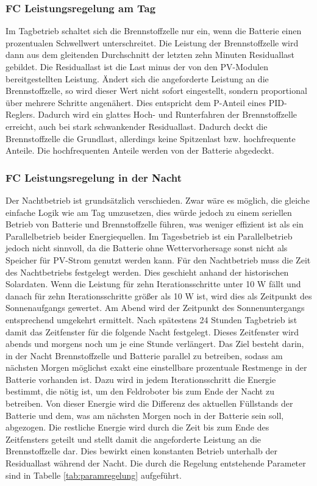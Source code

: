 \subsubsection{FC Leistungsregelung am Tag}
Im Tagbetrieb schaltet sich die Brennstoffzelle nur ein, wenn die Batterie einen prozentualen Schwellwert unterschreitet. Die Leistung der Brennstoffzelle wird dann aus dem gleitenden Durchschnitt der letzten zehn Minuten Residuallast gebildet. Die Residuallast ist die Last minus der von den PV-Modulen bereitgestellten Leistung. Ändert sich die angeforderte Leistung an die Brennstoffzelle, so wird dieser Wert nicht sofort eingestellt, sondern proportional über mehrere Schritte angenähert. Dies entspricht dem P-Anteil eines PID-Reglers. Dadurch wird ein glattes Hoch- und Runterfahren der Brennstoffzelle erreicht, auch bei stark schwankender Residuallast. Dadurch deckt die Brennstoffzelle die Grundlast, allerdings keine Spitzenlast bzw. hochfrequente Anteile. Die hochfrequenten Anteile werden von der Batterie abgedeckt. \\

\subsubsection{FC Leistungsregelung in der Nacht}
Der Nachtbetrieb ist grundsätzlich verschieden. Zwar wäre es möglich, die gleiche einfache Logik wie am Tag umzusetzen, dies würde jedoch zu einem seriellen Betrieb von Batterie und Brennstoffzelle führen, was weniger effizient ist als ein Parallelbetrieb beider Energiequellen. 
Im Tagesbetrieb ist ein Parallelbetrieb jedoch nicht sinnvoll, da die Batterie ohne Wettervorhersage sonst nicht als Speicher für PV-Strom genutzt werden kann. Für den Nachtbetrieb muss die Zeit des Nachtbetriebs festgelegt werden. Dies geschieht anhand der historischen Solardaten. Wenn die Leistung für zehn Iterationsschritte unter 10 W fällt und danach für zehn Iterationsschritte größer als 10 W ist, wird dies als Zeitpunkt des Sonnenaufgangs gewertet. Am Abend wird der Zeitpunkt des Sonnenuntergangs entsprechend umgekehrt ermittelt. Nach spätestens 24 Stunden Tagbetrieb ist damit das Zeitfenster für die folgende Nacht festgelegt. Dieses Zeitfenster wird abends und morgens noch um je eine Stunde verlängert. Das Ziel besteht darin, in der Nacht Brennstoffzelle und Batterie parallel zu betreiben, sodass am nächsten Morgen möglichst exakt eine einstellbare prozentuale Restmenge in der Batterie vorhanden ist. Dazu wird in jedem Iterationsschritt die Energie bestimmt, die nötig ist, um den Feldroboter bis zum Ende der Nacht zu betreiben. Von dieser Energie wird die Differenz des aktuellen Füllstands der Batterie und dem, was am nächsten Morgen noch in der Batterie sein soll, abgezogen. Die restliche Energie wird durch die Zeit bis zum Ende des Zeitfensters geteilt und stellt damit die angeforderte Leistung an die Brennstoffzelle dar. Dies bewirkt einen konstanten Betrieb unterhalb der Residuallast während der Nacht. Die durch die Regelung entstehende Parameter sind in Tabelle \ref{tab:paramregelung} aufgeführt. \\

